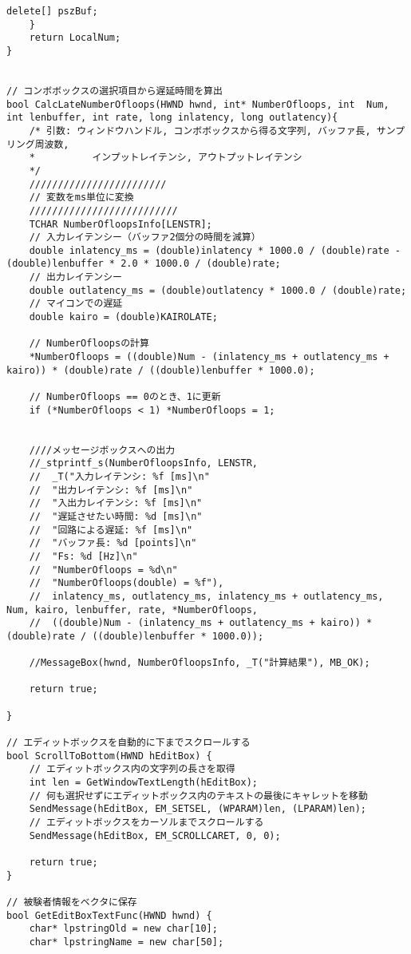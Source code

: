 \begin{lstlisting}[caption=main.cpp]
		delete[] pszBuf;
	}
	return LocalNum;
}


// コンボボックスの選択項目から遅延時間を算出
bool CalcLateNumberOfloops(HWND hwnd, int* NumberOfloops, int  Num, int lenbuffer, int rate, long inlatency, long outlatency){
	/* 引数: ウィンドウハンドル, コンボボックスから得る文字列, バッファ長, サンプリング周波数, 
	*          インプットレイテンシ, アウトプットレイテンシ
	*/
	////////////////////////
	// 変数をms単位に変換
	//////////////////////////
	TCHAR NumberOfloopsInfo[LENSTR];
	// 入力レイテンシー（バッファ2個分の時間を減算）
	double inlatency_ms = (double)inlatency * 1000.0 / (double)rate - (double)lenbuffer * 2.0 * 1000.0 / (double)rate;
	// 出力レイテンシー
	double outlatency_ms = (double)outlatency * 1000.0 / (double)rate;
	// マイコンでの遅延
	double kairo = (double)KAIROLATE;

	// NumberOfloopsの計算
	*NumberOfloops = ((double)Num - (inlatency_ms + outlatency_ms + kairo)) * (double)rate / ((double)lenbuffer * 1000.0);

	// NumberOfloops == 0のとき、1に更新
	if (*NumberOfloops < 1) *NumberOfloops = 1;


	////メッセージボックスへの出力
	//_stprintf_s(NumberOfloopsInfo, LENSTR,
	//	_T("入力レイテンシ: %f [ms]\n"
	//	"出力レイテンシ: %f [ms]\n"
	//	"入出力レイテンシ: %f [ms]\n"
	//	"遅延させたい時間: %d [ms]\n"
	//	"回路による遅延: %f [ms]\n"
	//	"バッファ長: %d [points]\n"
	//	"Fs: %d [Hz]\n"
	//	"NumberOfloops = %d\n"
	//	"NumberOfloops(double) = %f"),
	//	inlatency_ms, outlatency_ms, inlatency_ms + outlatency_ms, Num, kairo, lenbuffer, rate, *NumberOfloops,
	//	((double)Num - (inlatency_ms + outlatency_ms + kairo)) * (double)rate / ((double)lenbuffer * 1000.0));

	//MessageBox(hwnd, NumberOfloopsInfo, _T("計算結果"), MB_OK);

	return true;

}

// エディットボックスを自動的に下までスクロールする
bool ScrollToBottom(HWND hEditBox) {
	// エディットボックス内の文字列の長さを取得
	int len = GetWindowTextLength(hEditBox);
	// 何も選択せずにエディットボックス内のテキストの最後にキャレットを移動
	SendMessage(hEditBox, EM_SETSEL, (WPARAM)len, (LPARAM)len);
	// エディットボックスをカーソルまでスクロールする
	SendMessage(hEditBox, EM_SCROLLCARET, 0, 0);

	return true;
}

// 被験者情報をベクタに保存
bool GetEditBoxTextFunc(HWND hwnd) {
	char* lpstringOld = new char[10];
	char* lpstringName = new char[50];


\end{lstlisting}
